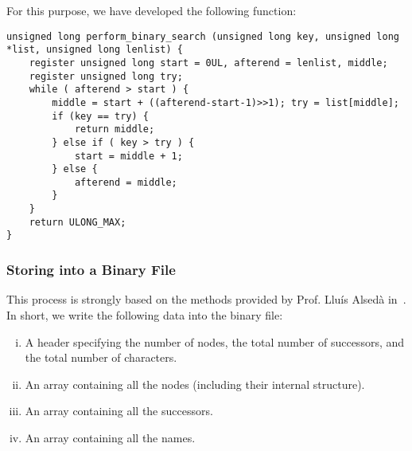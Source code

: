 For this purpose, we have developed the following  function:
\begin{lstlisting}
unsigned long perform_binary_search (unsigned long key, unsigned long *list, unsigned long lenlist) {
	register unsigned long start = 0UL, afterend = lenlist, middle;
	register unsigned long try;
	while ( afterend > start ) {
		middle = start + ((afterend-start-1)>>1); try = list[middle];
		if (key == try) {
			return middle;
		} else if ( key > try ) {
			start = middle + 1;
		} else {
			afterend = middle;
		}
	}
	return ULONG_MAX;
}
\end{lstlisting}

\subsubsection*{Storing into a Binary File}
This process is strongly based on the methods provided by Prof. Lluís Alsedà in~\cite{AlsedaRWBin}. In short, we write the following data into the  binary file:
\begin{enumerate}[(i)]
	\item A header specifying the number of nodes, the total number of successors, and the total number of characters.
    \item An array containing all the nodes (including their internal  structure).
    \item An array containing all the successors.
    \item An array containing all the names.
\end{enumerate}

